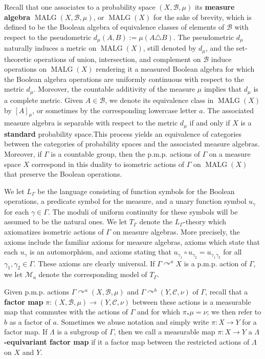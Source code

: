\documentclass[12pt]{amsart}
\theoremstyle{definition}
\def\cal{\mathcal}
\def \Malg{\operatorname{MALG}}
\newcommand{\pmp}{p{$.$}m{$.$}p{$.$}}
\newcommand{\acts}{\curvearrowright}
\begin{document}
Recall that one associates to a probability space $(X,\cal B,\mu)$ its \textbf{measure algebra} $\Malg(X,\mathcal{B},\mu)$, or $\Malg(X)$ for the sake of brevity, which is defined to be the Boolean algebra of equivalence classes of elements of $\cal B$ with respect to the pseudometric $d_\mu(A,B):=\mu(A\triangle B)$.  The pseudometric $d_\mu$ naturally induces a metric on $\Malg(X)$, still denoted by $d_\mu$, and the set-theoretic operations of union, intersection, and complement on $\cal B$ induce operations on $\Malg(X)$ rendering it a measured Boolean algebra for which the Boolean algebra operations are uniformly continuous with respect to the metric $d_\mu$.  Moreover, the countable additivity of the measure $\mu$ implies that $d_\mu$ is a complete metric.  Given $A\in \mathcal{B}$, we denote its equivalence class in $\Malg(X)$ by $[A]_\mu$, or sometimes by the corresponding lowercase letter $a$.  The associated measure algebra is separable with respect to the metric $d_\mu$ if and only if $X$ is a \textbf{standard} probability space.This process yields an equivalence of categories between the categories of probability spaces and the associated measure algebras.  Moreover, if $\Gamma$ is a countable group, then the {\pmp} actions of $\Gamma$ on a measure space $X$ correspond in this duality to isometric actions of $\Gamma$ on $\Malg(X)$ that preserve the Boolean operations.

We let $L_\Gamma$ be the language consisting of function symbols for the Boolean operations, a predicate symbol for the measure, and a unary function symbol $u_\gamma$ for each $\gamma\in \Gamma$.  The moduli of uniform continuity for these symbols will be assumed to be the natural ones.  We let $T_\Gamma$ denote the $L_\Gamma$-theory which axiomatizes isometric actions of $\Gamma$ on measure algebras.  More precisely, the axioms include the familiar axioms for measure algebras, axioms which state that each $u_\gamma$ is an automorphism, and axioms stating that $u_{\gamma_1}\circ u_{\gamma_2}=u_{\gamma_1\gamma_2}$ for all $\gamma_1,\gamma_2\in \Gamma$.  These axioms are clearly universal.  If $\Gamma\acts^a X$ is a {\pmp} action of $\Gamma$, we let $\cal M_a$ denote the corresponding model of $T_\Gamma$.

Given {\pmp} actions $\Gamma\acts^a (X,\cal B,\mu)$ and $\Gamma\acts^b(Y,\cal C,\nu)$ of $\Gamma$, recall that a \textbf{factor map} $\pi:(X,\cal B,\mu)\to (Y,\cal C,\nu)$ between these actions is a measurable map that commutes with the actions of $\Gamma$ and for which $\pi_*\mu=\nu$; we then refer to $b$ as a factor of $a$.  Sometimes we abuse notation and simply write $\pi:X\to Y$ for a factor map.  If $\Lambda$ is a subgroup of $\Gamma$, then we call a measurable map $\pi:X\to Y$ a \textbf{$\Lambda$-equivariant factor map} if it a factor map between the restricted actions of $\Lambda$ on $X$ and $Y$.
\end{document}
